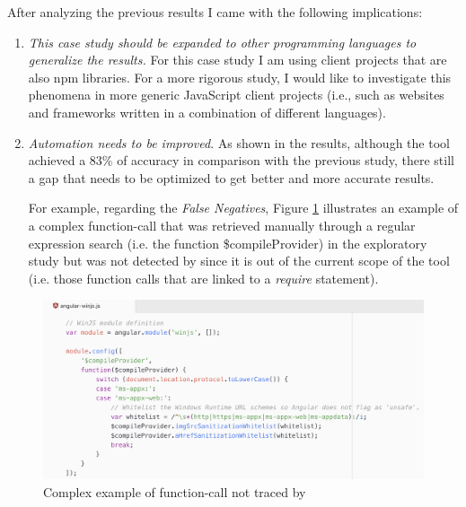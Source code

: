 After analyzing the previous results I came with the following implications:
\begin{enumerate}
    \item \textit{This case study should be expanded to other programming languages to generalize the results.}
    For this case study I am using client projects that are also npm libraries. 
    For a more rigorous study, I would like to investigate this phenomena in more generic JavaScript client projects (i.e., such as websites and frameworks written in a combination of different languages).
    \item \textit{Automation needs to be improved}. As shown in the results, although the tool achieved a 83\% of accuracy in comparison with the previous study, there still a gap that needs to be optimized to get better and more accurate results.
    
    For example, regarding the \textit{False Negatives}, Figure \ref{fig:falseNegativeExample} illustrates an example of a complex function-call that was retrieved manually through a regular expression search (i.e. the function \$compileProvider) in the exploratory study but was not detected by \tool[] since it is out of the current scope of the tool (i.e. those function calls that are linked to a \textit{require} statement).
\end{enumerate}

\begin{figure}[ht]
\centering
\includegraphics[width=1\textwidth]{images/false_negatives_reason.png}
\caption{Complex example of function-call not traced by \tool[]}
\label{fig:falseNegativeExample}
\end{figure}
